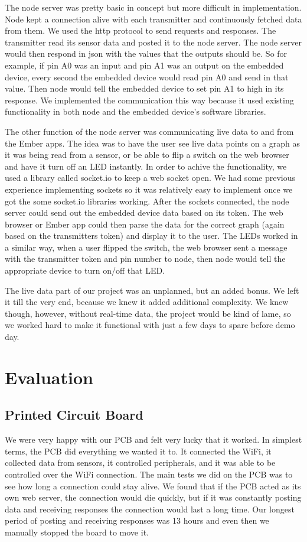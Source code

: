 \documentclass[letterpaper, 12 pt]{article}
\begin{document}
  The node server was pretty basic in concept but more difficult in implementation. Node kept a connection alive with each transmitter and continuously fetched data from them. We used the http protocol to send requests and responses. The transmitter read its sensor data and posted it to the node server. The node server would then respond in json with the values that the outputs should be. So for example, if pin A0 was an input and pin A1 was an output on the embedded device, every second the embedded device would read pin A0 and send in that value. Then node would tell the embedded device to set pin A1 to high in its response. We implemented the communication this way because it used existing functionality in both node and the embedded device’s software libraries.

    The other function of the node server was communicating live data to and from the Ember apps. The idea was to have the user see live data points on a graph as it was being read from a sensor, or be able to flip a switch on the web browser and have it turn off an LED instantly. In order to achive the functionality, we used a library called socket.io to keep a web socket open. We had some previous experience implementing sockets so it was relatively easy to implement once we got the some socket.io libraries working. After the sockets connected, the node server could send out the embedded device data based on its token. The web browser or Ember app could then parse the data for the correct graph (again based on the transmitters token) and display it to the user. The LEDs worked in a similar way, when a user flipped the switch, the web browser sent a message with the transmitter token and pin number to node, then node would tell the appropriate device to turn on/off that LED. 

    The live data part of our project was an unplanned, but an added bonus. We left it till the very end, because we knew it added additional complexity. We knew though, however, without real-time data, the project would be kind of lame, so we worked hard to make it functional with just a few days to spare before demo day.  

\section{Evaluation}

\subsection{Printed Circuit Board}
We were very happy with our PCB and felt very lucky that it worked. In simplest terms, the PCB did everything we wanted it to. It connected the WiFi, it collected data from sensors, it controlled peripherals, and it was able to be controlled over the WiFi connection. The main tests we did on the PCB was to see how long a connection could stay alive. We found that if the PCB acted as its own web server, the connection would die quickly, but if it was constantly posting data and receiving responses the connection would last a long time. Our longest period of posting and receiving responses was 13 hours  and even then we manually stopped the board to move it. 
\end{document}
